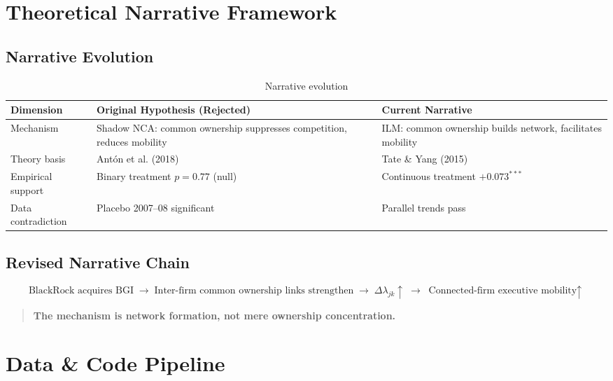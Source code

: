 \documentclass[11pt,a4paper]{article}
\begin{document}
\newpage

\section{Theoretical Narrative Framework}

\subsection{Narrative Evolution}

\begin{table}[h!]
\centering
\begin{tabular}{p{3cm}p{5cm}p{5cm}}
\toprule
\textbf{Dimension} & \textbf{Original Hypothesis (Rejected)} & \textbf{Current Narrative} \\
\midrule
Mechanism & Shadow NCA: common ownership suppresses competition, reduces mobility & ILM: common ownership builds network, facilitates mobility \\
Theory basis & Ant\'{o}n et al. (2018) & Tate \& Yang (2015) \\
Empirical support & Binary treatment \(p = 0.77\) (null) & Continuous treatment \(+0.073^{***}\) \\
Data contradiction & Placebo 2007--08 significant & Parallel trends pass \\
\bottomrule
\end{tabular}
\caption{Narrative evolution}
\end{table}

\subsection{Revised Narrative Chain}

\[
\boxed{\text{BlackRock acquires BGI}} \;\longrightarrow\; \boxed{\text{Inter-firm common ownership links strengthen}} \;\longrightarrow\; \boxed{\Delta\lambda_{jk} \uparrow} \;\longrightarrow\; \boxed{\text{Connected-firm executive mobility} \uparrow}
\]

\begin{quote}
{\bf The mechanism is network formation, not mere ownership concentration.}
\end{quote}

\newpage

\section{Data \& Code Pipeline}
\end{document}
